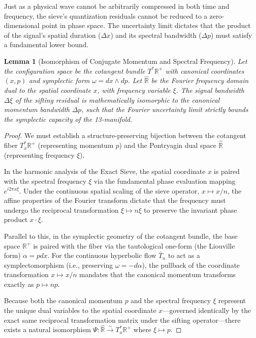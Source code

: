 \documentclass[sn-mathphys-num, pdflatex]{sn-jnl}
\newtheorem{lemma}{Lemma}
\begin{document}
Just as a physical wave cannot be arbitrarily compressed in both time and frequency, the sieve's quantization residuals cannot be reduced to a zero-dimensional point in phase space. The uncertainty limit dictates that the product of the signal's spatial duration ($\Delta x$) and its spectral bandwidth ($\Delta p$) must satisfy a fundamental lower bound.
\begin{lemma}[Isomorphism of Conjugate Momentum and Spectral Frequency]
\label{lemma:momentum_frequency_isomorphism}
Let the configuration space be the cotangent bundle $T^*\mathbb{R}^+$ with canonical coordinates $(x, p)$ and symplectic form $\omega = dx \wedge dp$. Let $\hat{\mathbb{R}}$ be the Fourier frequency domain dual to the spatial coordinate $x$, with frequency variable $\xi$. The signal bandwidth $\Delta \xi$ of the sifting residual is mathematically isomorphic to the canonical momentum bandwidth $\Delta p$, such that the Fourier uncertainty limit strictly bounds the symplectic capacity of the 13-manifold.
\end{lemma}

\begin{proof}
We must establish a structure-preserving bijection between the cotangent fiber $T_x^*\mathbb{R}^+$ (representing momentum $p$) and the Pontryagin dual space $\hat{\mathbb{R}}$ \cite{hewitt1979abstract} (representing frequency $\xi$). 

In the harmonic analysis of the Exact Sieve, the spatial coordinate $x$ is paired with the spectral frequency $\xi$ via the fundamental phase evaluation mapping $e^{i 2\pi x \xi}$. Under the continuous spatial scaling of the sieve operator, $x \mapsto x/n$, the affine properties of the Fourier transform dictate that the frequency must undergo the reciprocal transformation $\xi \mapsto n\xi$ to preserve the invariant phase product $x \cdot \xi$. 

Parallel to this, in the symplectic geometry of the cotangent bundle, the base space $\mathbb{R}^+$ is paired with the fiber via the tautological one-form (the Liouville form) $\alpha = p dx$. For the continuous hyperbolic flow $\overline{T}_n$ to act as a symplectomorphism (i.e., preserving $\omega = -d\alpha$), the pullback of the coordinate transformation $x \mapsto x/n$ mandates that the canonical momentum transforms exactly as $p \mapsto np$.

Because both the canonical momentum $p$ and the spectral frequency $\xi$ represent the unique dual variables to the spatial coordinate $x$—governed identically by the exact same reciprocal transformation matrix under the sifting operator—there exists a natural isomorphism $\Psi: \hat{\mathbb{R}} \xrightarrow{\sim} T_x^*\mathbb{R}^+$ where $\xi \mapsto p$.
\end{proof}
\end{document}

